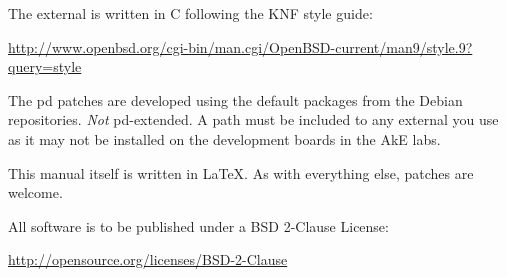 \documentclass{article}
\begin{document}
	The external is written in C following the KNF style guide: 
	
	\url{http://www.openbsd.org/cgi-bin/man.cgi/OpenBSD-current/man9/style.9?query=style}\medskip

	The pd patches are developed using the default packages from the Debian 
	repositories. \emph{Not} pd-extended. A path must be included to any 
	external you use as it may not be installed on the development boards in 
	the AkE labs.\medskip

	This manual itself is written in \LaTeX. As with everything else, patches 
	are welcome.\medskip

	All software is to be published under a BSD 2-Clause License:

	\url{http://opensource.org/licenses/BSD-2-Clause}
\end{document}
